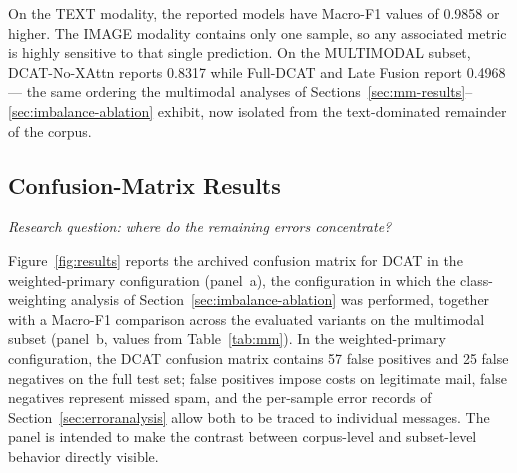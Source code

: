 \documentclass[10pt,twoside]{article}
\begin{document}
On the TEXT modality, the reported models have Macro-F1 values of 0.9858 or higher. The IMAGE modality contains only one sample, so any associated metric is highly sensitive to that single prediction. On the MULTIMODAL subset, DCAT-No-XAttn reports 0.8317 while Full-DCAT and Late Fusion report 0.4968 --- the same ordering the multimodal analyses of Sections~\ref{sec:mm-results}--\ref{sec:imbalance-ablation} exhibit, now isolated from the text-dominated remainder of the corpus.

\subsection{Confusion-Matrix Results}\label{sec:confusion}

\emph{Research question: where do the remaining errors concentrate?}

Figure~\ref{fig:results} reports the archived confusion matrix for DCAT in the weighted-primary configuration (panel~a), the configuration in which the class-weighting analysis of Section~\ref{sec:imbalance-ablation} was performed, together with a Macro-F1 comparison across the evaluated variants on the multimodal subset (panel~b, values from Table~\ref{tab:mm}). In the weighted-primary configuration, the DCAT confusion matrix contains 57 false positives and 25 false negatives on the full test set; false positives impose costs on legitimate mail, false negatives represent missed spam, and the per-sample error records of Section~\ref{sec:erroranalysis} allow both to be traced to individual messages. The panel is intended to make the contrast between corpus-level and subset-level behavior directly visible.
\end{document}
